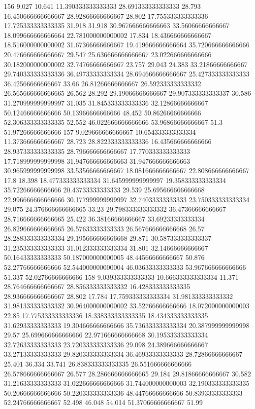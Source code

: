156 9.027 10.641 11.390333333333333 28.691333333333333 28.793 16.450666666666667 28.92866666666667 28.802 17.755333333333336 17.725333333333335 31.918 31.918 30.967666666666663 33.56066666666667 18.099666666666664 22.781000000000002 17.834 18.436666666666667 18.516000000000002 31.67366666666667 19.419666666666664 35.720666666666666 20.476666666666667 29.547 25.636666666666667 23.022666666666666 30.182000000000002 32.74766666666667 23.757 29.043 24.383 33.21866666666667 29.740333333333336 36.49733333333334 28.694666666666667 25.427333333333333 36.42566666666667 33.66 26.81266666666667 26.592333333333332 26.565666666666665 26.562 28.292 29.19066666666667 29.907333333333337 30.586 31.270999999999997 31.035 31.845333333333336 32.12866666666667 50.12466666666666 50.13966666666666 48.452 50.86266666666666 52.306333333333335 52.552 46.022666666666666 53.96866666666667 51.3 51.97266666666666
157 9.029666666666667 10.654333333333334 11.373666666666667 28.723 28.822333333333336 16.435666666666666 28.937333333333335 28.796666666666667 17.770333333333333 17.718999999999998 31.947666666666663 31.947666666666663 30.965999999999998 33.53566666666667 18.081666666666667 22.808666666666667 17.8 18.398 18.477333333333334 31.645999999999997 19.358333333333334 35.72266666666666 20.43733333333333 29.539 25.695666666666668 22.996666666666666 30.177999999999997 32.74033333333333 23.750333333333334 29.075 24.376666666666665 33.23 29.798333333333332 36.47366666666667 28.716666666666665 25.422 36.38166666666667 33.69233333333334 26.829666666666665 26.57633333333333 26.567666666666668 26.57 28.288333333333334 29.195666666666668 29.871 30.587333333333337 31.235333333333333 31.012333333333334 31.801 32.14666666666667 50.16433333333333 50.187000000000005 48.44566666666667 50.876 52.27766666666666 52.544000000000004 46.03633333333333 53.967666666666666 51.337 52.02766666666666
158 9.039333333333333 10.666333333333334 11.371 28.764666666666667 28.856333333333332 16.428333333333335 28.936666666666667 28.802 17.784 17.759333333333334 31.981333333333332 31.981333333333332 30.964000000000002 33.52766666666666 18.072000000000003 22.85 17.775333333333336 18.338333333333335 18.434333333333335 31.62933333333333 19.304666666666666 35.736333333333334 20.387999999999998 29.57 25.699666666666666 22.971666666666668 30.195333333333334 32.72633333333333 23.720333333333336 29.098 24.389666666666667 33.27133333333333 29.820333333333334 36.46933333333333 28.72866666666667 25.401 36.334 33.741 26.838333333333335 26.551666666666666 26.578666666666667 26.577 28.286666666666665 29.184 29.81866666666667 30.582 31.21633333333333 31.022666666666666 31.744000000000003 32.190333333333335 50.20666666666666 50.220333333333336 48.44766666666666 50.83933333333333 52.24766666666667 52.498 46.048 54.014 51.37066666666667 51.99
